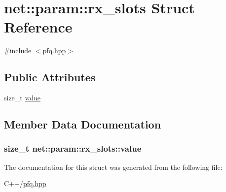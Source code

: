 \hypertarget{structnet_1_1param_1_1rx__slots}{\section{net\-:\-:param\-:\-:rx\-\_\-slots Struct Reference}
\label{structnet_1_1param_1_1rx__slots}
}


{\ttfamily \#include $<$pfq.\-hpp$>$}

\subsection*{Public Attributes}
\begin{DoxyCompactItemize}
\item 
size\-\_\-t \hyperlink{structnet_1_1param_1_1rx__slots_a7faa81257d9e7f5d55d33e5893f238b8}{value}
\end{DoxyCompactItemize}


\subsection{Member Data Documentation}
\hypertarget{structnet_1_1param_1_1rx__slots_a7faa81257d9e7f5d55d33e5893f238b8}{
\subsubsection[{value}]{\setlength{\rightskip}{0pt plus 5cm}size\-\_\-t net\-::param\-::rx\-\_\-slots\-::value}}\label{structnet_1_1param_1_1rx__slots_a7faa81257d9e7f5d55d33e5893f238b8}


The documentation for this struct was generated from the following file\-:\begin{DoxyCompactItemize}
\item 
C++/\hyperlink{pfq_8hpp}{pfq.\-hpp}\end{DoxyCompactItemize}
